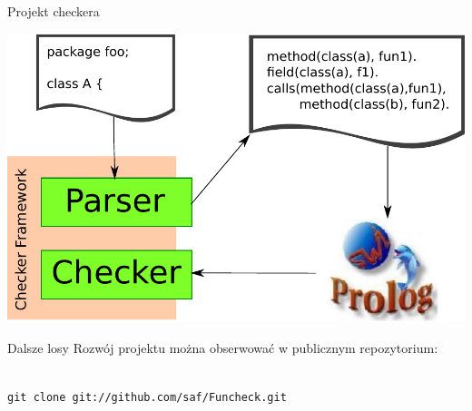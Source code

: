 \documentclass{beamer}
\begin{document}
\begin{frame}{Projekt checkera}
  \begin{center}
    \includegraphics[scale=0.6]{img/project.pdf}
  \end{center}
\end{frame}

\begin{frame}{Dalsze losy}
Rozwój projektu można obserwować w publicznym repozytorium:
\begin{center}
\vspace{3mm}
\\
\vspace{3mm}
\texttt{git clone git://github.com/saf/Funcheck.git}
\end{center}
\end{frame}
\end{document}
